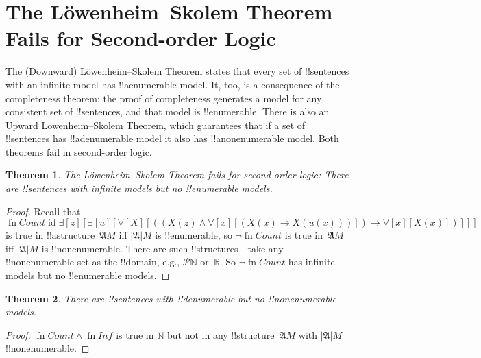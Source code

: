 \documentclass[10pt,a4paper]{article}
\theoremstyle{plain}
\newtheorem{thm}{Theorem}[section]
\theoremstyle{definition}
\theoremstyle{remark}
\newenvironment{explain}{}{}
\newcommand*{\olfileid}[3]{}
\newcommand*{\olsection}[1]{\section*{#1}}
\newcommand*{\olchapter}[3]{}
\newcommand*{\ollabel}[1]{\label{#1}}
\providecommand{\lif}{\mathbin{\rightarrow}}
\providecommand{\lforall}{\mathord{\forall}}
\providecommand{\lexists}{\mathord{\exists}}
\providecommand{\Struct}{\ensuremath{\mathfrak{A}}}
\providecommand{\Domain}{\ensuremath{|\mathfrak{A}|}}
\providecommand{\Nat}{\ensuremath{\mathbb{N}}}
\providecommand{\Real}{\mathbb{R}}
\providecommand{\Pow}{\mathcal{P}}
\providecommand{\ident}{\operatorname{id}}
\providecommand{\fn}{\operatorname{fn}}
\providecommand{\fn}{\operatorname{fn}}
\begin{document}
\olfileid{sol}{met}{lst}

\olsection{The L\"owenheim--Skolem Theorem Fails for Second-order Logic}

\begin{explain}
The (Downward) L\"owenheim--Skolem Theorem states that every set of
!!{sentence}s with an infinite model has !!a{enumerable} model.  It,
too, is a consequence of the completeness theorem: the proof of
completeness generates a model for any consistent set of
!!{sentence}s, and that model is !!{enumerable}.  There is also an
Upward L\"owenheim--Skolem Theorem, which guarantees that if a set of
!!{sentence}s has !!a{denumerable} model it also has
!!a{nonenumerable} model.  Both theorems fail in second-order logic.
\end{explain}


\begin{thm}
\ollabel{thm:sol-no-ls} The L\"owenheim--Skolem Theorem fails for
second-order logic: There are !!{sentence}s with infinite models but
no !!{enumerable} models.
\end{thm}

\begin{proof}
Recall that 
\[
\fn{Count} \ident \lexists[z][\lexists[u][\lforall[X][((X(z) \land
      \lforall[x][(X(x) \lif X(u(x)))]) \lif \lforall[x][X(x)])]]]
\]
is true in !!a{structure}~$\Struct{M}$ iff $\Domain{M}$ is
!!{enumerable}, so $\lnot\fn{Count}$ is true in~$\Struct{M}$
iff $\Domain{M}$ is !!{nonenumerable}.  There are
such !!{structure}s---take any !!{nonenumerable} set as the
!!{domain}, e.g., $\Pow{\Nat}$ or~$\Real$. So $\lnot \fn{Count}$ 
has infinite models but no !!{enumerable} models.
\end{proof}

\begin{thm}
There are !!{sentence}s with !!{denumerable} but no
!!{nonenumerable} models.
\end{thm}

\begin{proof}
$\fn{Count} \land \fn{Inf}$ is true in $\Nat$ but not in any
  !!{structure}~$\Struct{M}$ with $\Domain{M}$ !!{nonenumerable}.
\end{proof}






\olchapter{sol}{met}{Metatheory of Second-order Logic}
\end{document}
